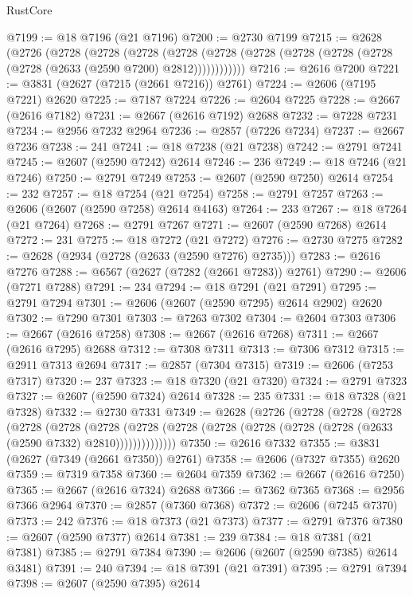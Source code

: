 \begin{lexlean}{RustCore}
\begin{coremodule}
@7199 := @18 @7196 (@21 @7196)
@7200 := @2730 @7199
@7215 := @2628
    (@2726
      (@2728
        (@2728
          (@2728
            (@2728 (@2728 (@2728 (@2728 (@2728 (@2728 (@2728 (@2633 (@2590 @7200) @2812))))))))))))
@7216 := @2616 @7200
@7221 := @3831 (@2627 (@7215 (@2661 @7216)) @2761)
@7224 := @2606 (@7195 @7221) @2620
@7225 := @7187 @7224
@7226 := @2604 @7225
@7228 := @2667 (@2616 @7182)
@7231 := @2667 (@2616 @7192) @2688
@7232 := @7228 @7231
@7234 := @2956 @7232 @2964
@7236 := @2857 (@7226 @7234)
@7237 := @2667 @7236
@7238 := 241
@7241 := @18 @7238 (@21 @7238)
@7242 := @2791 @7241
@7245 := @2607 (@2590 @7242) @2614
@7246 := 236
@7249 := @18 @7246 (@21 @7246)
@7250 := @2791 @7249
@7253 := @2607 (@2590 @7250) @2614
@7254 := 232
@7257 := @18 @7254 (@21 @7254)
@7258 := @2791 @7257
@7263 := @2606 (@2607 (@2590 @7258) @2614 @4163)
@7264 := 233
@7267 := @18 @7264 (@21 @7264)
@7268 := @2791 @7267
@7271 := @2607 (@2590 @7268) @2614
@7272 := 231
@7275 := @18 @7272 (@21 @7272)
@7276 := @2730 @7275
@7282 := @2628 (@2934 (@2728 (@2633 (@2590 @7276) @2735)))
@7283 := @2616 @7276
@7288 := @6567 (@2627 (@7282 (@2661 @7283)) @2761)
@7290 := @2606 (@7271 @7288)
@7291 := 234
@7294 := @18 @7291 (@21 @7291)
@7295 := @2791 @7294
@7301 := @2606 (@2607 (@2590 @7295) @2614 @2902) @2620
@7302 := @7290 @7301
@7303 := @7263 @7302
@7304 := @2604 @7303
@7306 := @2667 (@2616 @7258)
@7308 := @2667 (@2616 @7268)
@7311 := @2667 (@2616 @7295) @2688
@7312 := @7308 @7311
@7313 := @7306 @7312
@7315 := @2911 @7313 @2694
@7317 := @2857 (@7304 @7315)
@7319 := @2606 (@7253 @7317)
@7320 := 237
@7323 := @18 @7320 (@21 @7320)
@7324 := @2791 @7323
@7327 := @2607 (@2590 @7324) @2614
@7328 := 235
@7331 := @18 @7328 (@21 @7328)
@7332 := @2730 @7331
@7349 := @2628
    (@2726
      (@2728
        (@2728
          (@2728
            (@2728
              (@2728
                (@2728
                  (@2728 (@2728 (@2728 (@2728 (@2728 (@2728 (@2633 (@2590 @7332) @2810))))))))))))))
@7350 := @2616 @7332
@7355 := @3831 (@2627 (@7349 (@2661 @7350)) @2761)
@7358 := @2606 (@7327 @7355) @2620
@7359 := @7319 @7358
@7360 := @2604 @7359
@7362 := @2667 (@2616 @7250)
@7365 := @2667 (@2616 @7324) @2688
@7366 := @7362 @7365
@7368 := @2956 @7366 @2964
@7370 := @2857 (@7360 @7368)
@7372 := @2606 (@7245 @7370)
@7373 := 242
@7376 := @18 @7373 (@21 @7373)
@7377 := @2791 @7376
@7380 := @2607 (@2590 @7377) @2614
@7381 := 239
@7384 := @18 @7381 (@21 @7381)
@7385 := @2791 @7384
@7390 := @2606 (@2607 (@2590 @7385) @2614 @3481)
@7391 := 240
@7394 := @18 @7391 (@21 @7391)
@7395 := @2791 @7394
@7398 := @2607 (@2590 @7395) @2614

\end{coremodule}
\end{lexlean}
